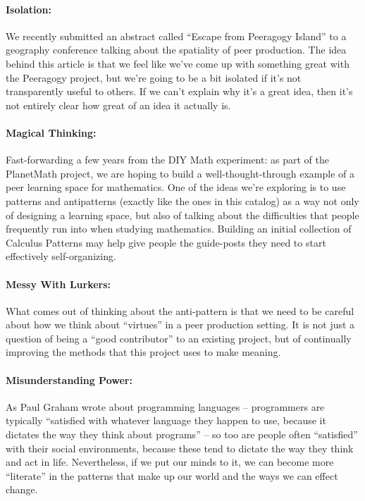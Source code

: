 \paragraph{Isolation:} We recently submitted an abstract called “Escape from Peeragogy Island”
to a geography conference talking about the spatiality of peer
production. The idea behind this article is that we feel like we’ve come
up with something great with the Peeragogy project, but we’re going to
be a bit isolated if it’s not transparently useful to others. If we
can’t explain why it’s a great idea, then it’s not entirely clear how
great of an idea it actually is.

\paragraph{Magical Thinking:}  Fast-forwarding a few years from the DIY Math experiment: as part of the
PlanetMath project, we are hoping to build a well-thought-through
example of a peer learning space for mathematics. One of the ideas we’re
exploring is to use patterns and antipatterns (exactly like the ones in
this catalog) as a way not only of designing a learning space, but also
of talking about the difficulties that people frequently run into when
studying mathematics. Building an initial collection of Calculus
Patterns may help give people the guide-posts they need to start
effectively self-organizing.

\paragraph{Messy With Lurkers:} What comes out of thinking about the anti-pattern is that we need to be
careful about how we think about “virtues” in a peer production setting.
It is not just a question of being a “good contributor” to an existing
project, but of continually improving the methods that this project uses
to make meaning.

\paragraph{Misunderstanding Power:} As Paul Graham wrote about programming languages – programmers are
typically “satisfied with whatever language they happen to use, because
it dictates the way they think about programs” – so too are people often
“satisfied” with their social environments, because these tend to
dictate the way they think and act in life. Nevertheless, if we put our
minds to it, we can become more “literate” in the patterns that make up
our world and the ways we can effect change.

